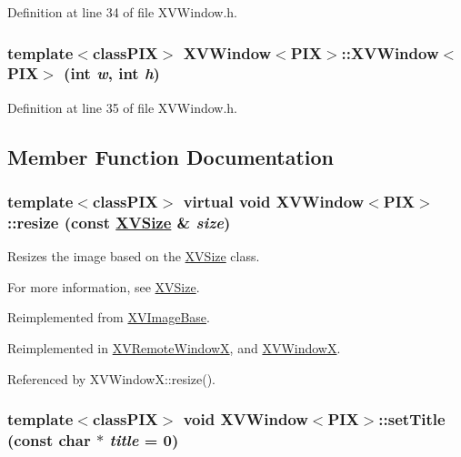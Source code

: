 Definition at line 34 of file XVWindow.h.\label{XVWindow_a1}
\hypertarget{class_XVWindow_a1}{
\subsubsection[XVWindow]{\setlength{\rightskip}{0pt plus 5cm}template$<$classPIX$>$ XVWindow$<$PIX$>$::XVWindow$<$PIX$>$ (int {\em w}, int {\em h})}}




Definition at line 35 of file XVWindow.h.

\subsection{Member Function Documentation}
\label{XVWindow_a4}
\hypertarget{class_XVWindow_a4}{
\subsubsection[resize]{\setlength{\rightskip}{0pt plus 5cm}template$<$classPIX$>$ virtual void XVWindow$<$PIX$>$::resize (const \hyperlink{class_XVSize}{XVSize} \& {\em size})}}


Resizes the image based on the \hyperlink{class_XVSize}{XVSize} class.

For more information, see \hyperlink{class_XVSize}{XVSize}. 

Reimplemented from \hyperlink{class_XVImageBase_a13}{XVImage\-Base}.

Reimplemented in \hyperlink{class_XVRemoteWindowX_a9}{XVRemote\-Window\-X}, and \hyperlink{class_XVWindowX_a2}{XVWindow\-X}.

Referenced by XVWindow\-X::resize().\label{XVWindow_a5}
\hypertarget{class_XVWindow_a5}{
\subsubsection[setTitle]{\setlength{\rightskip}{0pt plus 5cm}template$<$classPIX$>$ void XVWindow$<$PIX$>$::set\-Title (const char $\ast$ {\em title} = 0)}}




